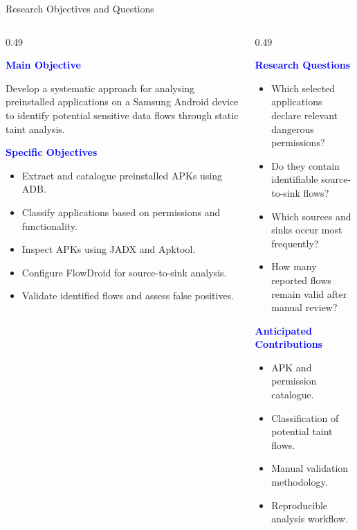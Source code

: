 \documentclass[aspectratio=169,10pt]{beamer}
\newcommand{\hd}[1]{\textbf{\textcolor{blue}{#1}}}
\begin{document}
\begin{frame}{Research Objectives and Questions}

\begin{columns}[T]

\begin{column}{0.49\textwidth}

\hd{Main Objective}

\small
Develop a systematic approach for analysing preinstalled applications on a Samsung Android device to identify potential sensitive data flows through static taint analysis.

\vspace{5pt}

\hd{Specific Objectives}

\begin{itemize}
    \small
    \item Extract and catalogue preinstalled APKs using ADB.
    \item Classify applications based on permissions and functionality.
    \item Inspect APKs using JADX and Apktool.
    \item Configure FlowDroid for source-to-sink analysis.
    \item Validate identified flows and assess false positives.
\end{itemize}

\end{column}

\begin{column}{0.49\textwidth}

\hd{Research Questions}

\begin{itemize}
    \small
    \item Which selected applications declare relevant dangerous permissions?
    \item Do they contain identifiable source-to-sink flows?
    \item Which sources and sinks occur most frequently?
    \item How many reported flows remain valid after manual review?
\end{itemize}

\hd{Anticipated Contributions}

\begin{itemize}
    \small
    \item APK and permission catalogue.
    \item Classification of potential taint flows.
    \item Manual validation methodology.
    \item Reproducible analysis workflow.
\end{itemize}

\end{column}

\end{columns}

\end{frame}
\end{document}
